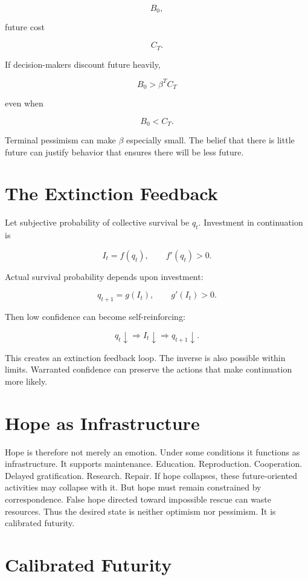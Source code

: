 \documentclass[11pt,oneside]{book}
\theoremstyle{definition}
\theoremstyle{remark}
\begin{document}
\[
B_0,
\]

future cost

\[
C_T.
\]

If decision-makers discount future heavily,

\[
B_0>\beta^T C_T
\]

even when

\[
B_0<C_T.
\]

Terminal pessimism can make \(\beta\) especially small. The belief that there is little future can
justify behavior that ensures there will be less future.

\section{The Extinction Feedback}

Let subjective probability of collective survival be \(q_t\). Investment in continuation is

\[
I_t=f(q_t), \qquad f'(q_t)>0.
\]

Actual survival probability depends upon investment:

\[
q_{t+1}=g(I_t), \qquad g'(I_t)>0.
\]

Then low confidence can become self-reinforcing:

\[
q_t\downarrow \Rightarrow I_t\downarrow \Rightarrow q_{t+1}\downarrow.
\]

This creates an extinction feedback loop. The inverse is also possible within limits. Warranted
confidence can preserve the actions that make continuation more likely.

\section{Hope as Infrastructure}

Hope is therefore not merely an emotion. Under some conditions it functions as infrastructure. It
supports maintenance. Education. Reproduction. Cooperation. Delayed gratification. Research. Repair.
If hope collapses, these future-oriented activities may collapse with it. But hope must remain
constrained by correspondence. False hope directed toward impossible rescue can waste resources.
Thus the desired state is neither optimism nor pessimism. It is calibrated futurity.

\section{Calibrated Futurity}
\end{document}
